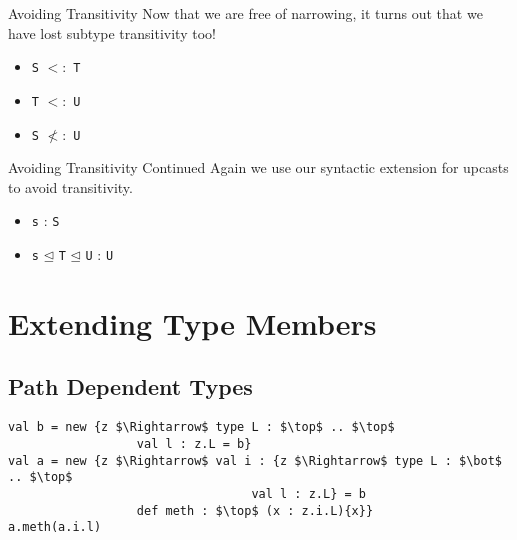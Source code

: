 \documentclass[dvipsnames]{beamer}
\begin{document}
\begin{frame}{Avoiding Transitivity}
Now that we are free of narrowing, it turns out that we have lost subtype transitivity too!
\begin{block}{ }
\usebox{\tmExTrans}
\end{block}
\begin{itemize}
\item
\texttt{S} $<:$ \texttt{T}
\item
\texttt{T} $<:$ \texttt{U}
\item
\texttt{S} $\not<:$ \texttt{U}
\end{itemize}
\end{frame}

\begin{frame}{Avoiding Transitivity Continued}
Again we use our syntactic extension for upcasts to avoid transitivity.
\begin{itemize}
\item
\texttt{s} : \texttt{S}
\item
\texttt{s} $\unlhd$ \texttt{T} $\unlhd$ \texttt{U} : \texttt{U}
\end{itemize}
\end{frame}

\section{Extending Type Members}

\subsection{Path Dependent Types}


\begin{lrbox}{\tmExPaths}
\begin{lstlisting}[mathescape, style=customlang]
val b = new {z $\Rightarrow$ type L : $\top$ .. $\top$
                  val l : z.L = b}
val a = new {z $\Rightarrow$ val i : {z $\Rightarrow$ type L : $\bot$ .. $\top$
                                  val l : z.L} = b
                  def meth : $\top$ (x : z.i.L){x}}
a.meth(a.i.l)
\end{lstlisting}
\end{lrbox}
\end{document}
